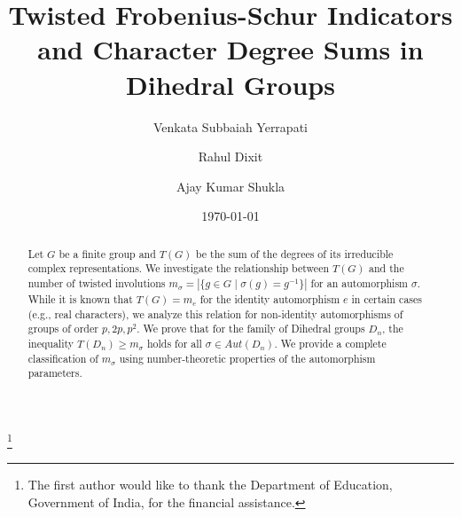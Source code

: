 \documentclass{amsart}
\theoremstyle{definition}
\theoremstyle{remark}
\newcommand{\Aut}{Aut}
\numberwithin{equation}{section}
\begin{document}
    
    \title{Twisted Frobenius-Schur Indicators and Character Degree Sums in Dihedral Groups}
    
    \author[Yerrapati]{Venkata Subbaiah Yerrapati}
    \address{(Yerrapati) Department of Mathematics, S. V. National Institute of Technology, Surat-7, Gujarat, India}
    \thanks{The first author would like to thank the Department of Education, Government of India, for the financial assistance.}
    
    \author[Dixit]{Rahul Dixit}
    \address{(Dixit) Department of Artificial Intelligence, S. V. National Institute of Technology, Surat-7, Gujarat, India}
    
    \author[Shukla]{Ajay Kumar Shukla}
    \address{(Shukla) Department of Mathematics, S. V. National Institute of Technology, Surat-7, Gujarat, India}
    
    
    \date{\today}
    
    
    
    \begin{abstract}
        Let $G$ be a finite group and $T(G)$ be the sum of the degrees of its irreducible complex representations. We investigate the relationship between $T(G)$ and the number of twisted involutions $m_\sigma = |\{g \in G \mid \sigma(g) = g^{-1}\}|$ for an automorphism $\sigma$. While it is known that $T(G) = m_e$ for the identity automorphism $e$ in certain cases (e.g., real characters), we analyze this relation for non-identity automorphisms of groups of order $p, 2p, p^2$. We prove that for the family of Dihedral groups $D_n$, the inequality $T(D_n) \geq m_\sigma$ holds for all $\sigma \in \Aut(D_n)$. We provide a complete classification of $m_\sigma$ using number-theoretic properties of the automorphism parameters.
    \end{abstract}

    \maketitle
    
\end{document}
